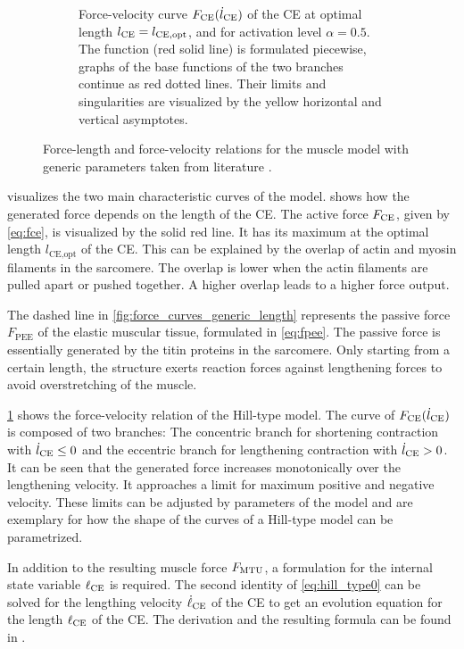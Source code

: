 \begin{figure}
\begin{subfigure}[t]{0.9\textwidth}
    \caption{Force-velocity curve $F_{\text{CE}}(\dot{l}_{\text{CE}})$ of the CE at optimal length $l_{\text{CE}}=l_{\text{CE},\text{opt}}$, and for activation level $\alpha=0.5$. The function (red solid line) is formulated piecewise, graphs of the base functions of the two branches continue as red dotted lines. Their limits and singularities are visualized by the yellow horizontal and vertical asymptotes.}%
    \label{fig:force_curves_generic_velocity}%
  \end{subfigure}%
  \caption{Force-length and force-velocity relations for the muscle model with generic parameters taken from literature \cite{Hilltype2014}.}%
  \label{fig:force_curves_generic}%
\end{figure}%

 visualizes the two main characteristic curves of the model. 
 shows how the generated force depends on the length of the CE. 
The active force $F_{\text{CE}}$, given by \cref{eq:fce}, is visualized by the solid red line. It has its maximum at the optimal length $l_\text{CE,opt}$ of the CE. This can be explained by the overlap of actin and myosin filaments in the sarcomere. The overlap is lower when the actin filaments are pulled apart or pushed together. A higher overlap leads to a higher force output.

The dashed line in \cref{fig:force_curves_generic_length} represents the passive force $F_\text{PEE}$ of the elastic muscular tissue, formulated in \cref{eq:fpee}. The passive force is essentially generated by the titin proteins in the sarcomere. Only starting from a certain length, the structure exerts reaction forces against lengthening forces to avoid overstretching of the muscle.

\cref{fig:force_curves_generic_velocity} shows the force-velocity relation of the Hill-type model. The curve of $F_{\text{CE}}(\dot{l}_{\text{CE}})$ is composed of two branches: 
The concentric branch for shortening contraction with $\dot{l}_{\text{CE}} \leq 0$ and the eccentric branch for lengthening contraction with $\dot{l}_{\text{CE}} > 0$. It can be seen that the generated force increases monotonically over the lengthening velocity. It approaches a limit for maximum positive and negative velocity. These limits can be adjusted by parameters of the model and are exemplary for how the shape of the curves of a Hill-type model can be parametrized.

In addition to the resulting muscle force $F_{\text{MTU}}$, a formulation for the internal state variable $\ell_{\text{CE}}$ is required.
The second identity of \eqref{eq:hill_type0} can be solved for the lengthing velocity $\dot{\ell}_{\text{CE}}$ of the CE to get an evolution equation for the length $\ell_{\text{CE}}$ of the CE. The derivation and the resulting formula can be found in \cite{Hilltype2014}.

